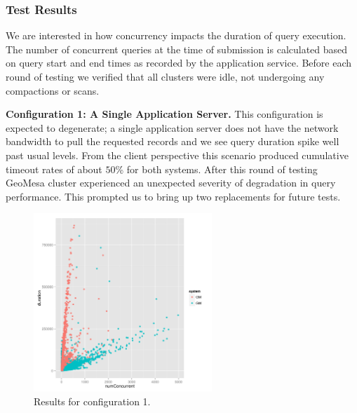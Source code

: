 \subsubsection{Test Results}

We are interested in how concurrency impacts the duration of query execution.
The number of concurrent queries at the time of submission is calculated based on query start and end times as recorded by the application service.
Before each round of testing we verified that all clusters were idle, not undergoing any compactions or scans.

{\bf Configuration 1: A Single Application Server.}
This configuration is expected to degenerate; a single application server does not have the network bandwidth to pull the requested records and we see query duration spike well past usual levels.
From the client perspective this scenario produced cumulative timeout rates of about $50$\% for both systems.
After this round of testing GeoMesa cluster experienced an unexpected severity of degradation in query performance.
This prompted us to bring up two replacements for future tests.
\begin{figure}[h!tb]
  \centering
  \includegraphics[width=0.60\textwidth]{../docs/img/multitenancy/graph_uncut_mt1.png}
  \caption{Results for configuration 1.}
  \label{config1}
\end{figure}

